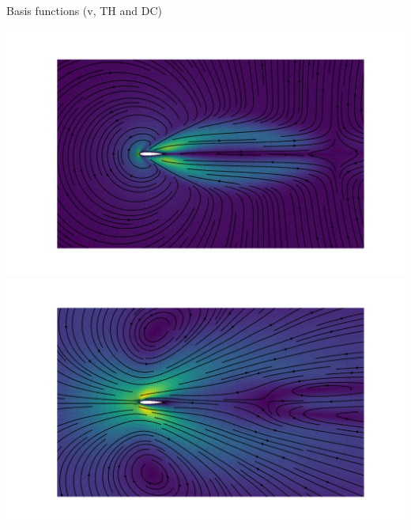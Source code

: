 \documentclass{beamer}
\begin{document}
\begin{frame}{Basis functions (v, TH and DC)}
  \begin{center}
    \includegraphics[trim={90mm 0 95mm 0},clip,height=0.95\textheight]{figs/bfun-v-no-piola-v001}
    \includegraphics[trim={90mm 0 95mm 0},clip,height=0.95\textheight]{figs/bfun-v-piola-v001}
  \end{center}
\end{frame}
\end{document}

